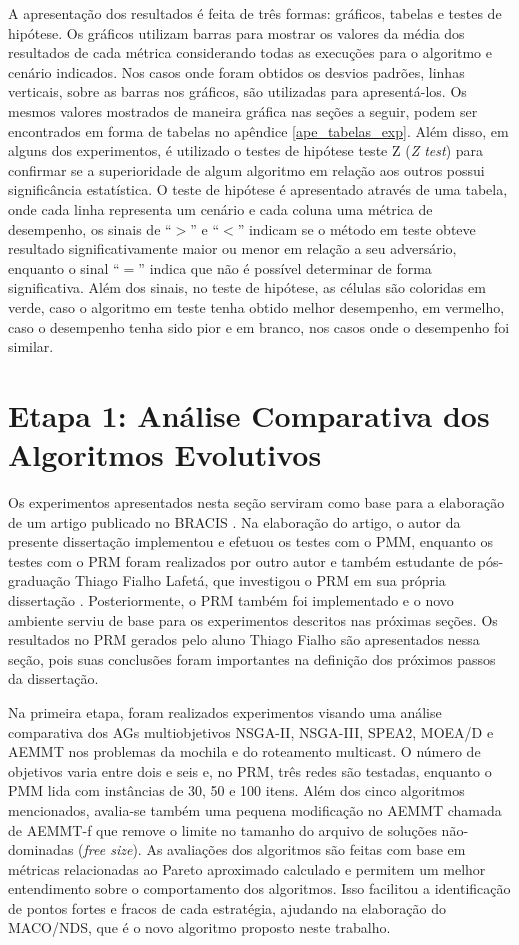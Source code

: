 A apresentação dos resultados é feita de três formas: gráficos, tabelas e testes de hipótese. Os gráficos utilizam barras para mostrar os valores da média dos resultados de cada métrica considerando todas as execuções para o algoritmo e cenário indicados. Nos casos onde foram obtidos os desvios padrões, linhas verticais, sobre as barras nos gráficos, são utilizadas para apresentá-los. Os mesmos valores mostrados de maneira gráfica nas seções a seguir, podem ser encontrados em forma de tabelas no apêndice \ref{ape_tabelas_exp}. Além disso, em alguns dos experimentos, é utilizado o testes de hipótese teste Z (\textit{Z test}) para confirmar se a superioridade de algum algoritmo em relação aos outros possui significância estatística. O teste de hipótese é apresentado através de uma tabela, onde cada linha representa um cenário e cada coluna uma métrica de desempenho, os sinais de ``$>$'' e ``$<$'' indicam se o método em teste obteve resultado significativamente maior ou menor em relação a seu adversário, enquanto o sinal ``$=$'' indica que não é possível determinar de forma significativa. Além dos sinais, no teste de hipótese, as células são coloridas em verde, caso o algoritmo em teste tenha obtido melhor desempenho, em vermelho, caso o desempenho tenha sido pior e em branco, nos casos onde o desempenho foi similar.

\section{Etapa 1: Análise Comparativa dos Algoritmos Evolutivos}
\label{section_experimentos_etapa1}

Os experimentos apresentados nesta seção serviram como base para a elaboração de um artigo publicado no \ac{BRACIS} \cite{Franca2017}. Na elaboração do artigo, o autor da presente dissertação implementou e efetuou os testes com o PMM, enquanto os testes com o PRM foram realizados por outro autor e também estudante de pós-graduação Thiago Fialho Lafetá, que investigou o PRM em sua própria dissertação \cite{LafetaThesis}. Posteriormente, o PRM também foi implementado e o novo ambiente serviu de base para os experimentos descritos nas próximas seções. Os resultados no PRM gerados pelo aluno Thiago Fialho são apresentados nessa seção, pois suas conclusões foram importantes na definição dos próximos passos da dissertação.

Na primeira etapa, foram realizados experimentos visando uma análise comparativa dos AGs multiobjetivos NSGA-II, NSGA-III, SPEA2, MOEA/D e AEMMT nos problemas da mochila e do roteamento multicast. O número de objetivos varia entre dois e seis e, no PRM, três redes são testadas, enquanto o PMM lida com instâncias de 30, 50 e 100 itens. Além dos cinco algoritmos mencionados, avalia-se também uma pequena modificação no AEMMT chamada de AEMMT-f que remove o limite no tamanho do arquivo de soluções não-dominadas (\textit{free size}). As avaliações dos algoritmos são feitas com base em métricas relacionadas ao Pareto aproximado calculado e permitem um melhor entendimento sobre o comportamento dos algoritmos. Isso facilitou a identificação de pontos fortes e fracos de cada estratégia, ajudando na elaboração do MACO/NDS, que é o novo algoritmo proposto neste trabalho.

